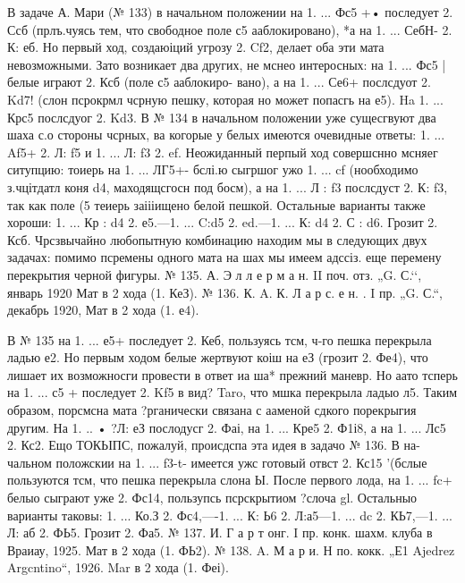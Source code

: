     В задаче А. Мари (№ 133) в начальном положении на 1. ... Фс5 +• последует 2. Ссб (прлъ.чуясь тем, что свободное поле с5 ааблокировано), *а на 1. ... СебН- 2. К: еб. Но первый ход, создаюіций угрозу 2. Cf2, делает оба эти мата невозможными. Зато возникает два других, не мснео интеросных: на 1. ... Фс5 | белые играют 2. Ксб (поле с5 ааблокиро- вано), а на 1. ... Се6+ послсдуот 2. Kd7! (слон псрокрмл чсрную пешку, которая но может попасгь на е5). Ha 1. ... Крс5 послсдуог
2. Kd3.
    В № 134 в начальном положении уже сущесгвуют два шаха с.о стороны чсрных, ва когорые у белых имеются очевидные ответы:
1. ... Af5+ 2. Л: f5 и 1. ... Л: f3 2. ef. Неожиданный перпый ход совершснно мсняег ситупцию: тоиерь на 1. ... ЛГ5+- бслі.ю сыгршог ужо 1. ... cf (нообходимо з.чцітдатл коня d4, маходящсгосн под босм), а на 1. ... Л : f3 послсдуст 2. К: f3, так как поле (5 теиерь заіііищено белой пешкой. Остальные варианты также хороши: 1. ... Кр : d4
2. е5.—1. ... C:d5 2. ed.—1. ... К: d4 2. С : d6. Грозит 2. Ксб.
    Чрсзвычайно любопытную комбинацию находим мы в следующих двух задачах: помимо псремены одного мата на шах мы имеем адссіз. еще перемену перекрытия черной фигуры.
№ 135. А. Э л л е р м а н.
II поч. отз. „G. С.‘‘, январь 1920
Мат в 2 хода (1. КеЗ).	№ 136. К. A. К. Л а р с. е н.
. I пр. „G. С.“, декабрь 1920,
Мат в 2 хода (1. е4).


    В № 135 на 1. ... е5+ последует 2. Кеб, пользуясь тсм, ч-го пешка перекрыла ладью е2. Но первым ходом белые жертвуют коіш на еЗ (грозит 2. Фе4), что лишает их возможносги провести в ответ иа ша* прежний маневр. Но аато тсперь на 1. ... с5 + последует 2. Kf5 в вид?
Taro, что мшка перекрыла ладыо л5. Таким образом, порсмсна мата ?рганически связана с ааменой сдкого порекрыгия другим. На 1. .. • ?Л: еЗ послодусг 2. Фаі, на 1. ... Кре5 2. Ф1і8, а на 1. ... Лс5
2. Кс2.
    Ещо ТОКЬІПС, пожалуй, происдспа эта идея в задачо № 136. В на- чальном положскии на 1. ... f3-t- имеется ужс готовый отвст 2. Кс15 '(бслые пользуются тсм, что пешка перекрыла слона Ы. После первого лода, на 1. ... fc+ белыо сыграют уже 2. Фс14, пользупсь псрскрытиом ?слоча gl. Остальныо варианты таковы: 1. ... Ко.З 2. Фс4,—-1. ... К: Ь6
2. Л:а5—1. ... dc 2. КЬ7,—1. ... Л: аб 2. ФЬ5. Грозит 2. Фа5.
№ 137. И. Г а р т онг.
I пр. конк. шахм. клуба в Враиау, 1925.
Мат в 2 хода (1. ФЬ2).
	№ 138. A. М а р и.
Н по. кокк. „Е1 Ajedrez Argcntino“, 1926.
Mar в 2 хода (1. Феі).


